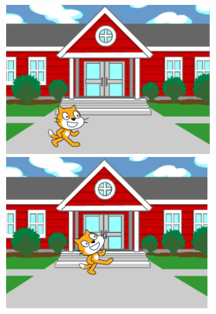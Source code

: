 \documentclass[10pt, a4paper]{article}
\begin{document}
\begin{enumerate}
        \begin{figure}[htb]
            \begin{minipage}[t]{.23\textwidth}
                \centering
                \includegraphics[width=\textwidth]{37-1.png}
            \end{minipage}
            \begin{minipage}[t]{.23\textwidth}
                \centering
                \includegraphics[width=\textwidth]{37-2.png}
            \end{minipage}
            \begin{minipage}[t]{.23\textwidth}
                \centering

\end{minipage}
\end{figure}
\end{enumerate}
\end{document}
